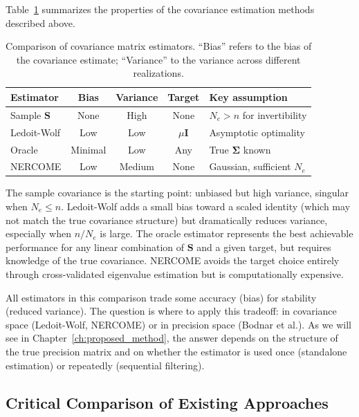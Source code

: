 Table~\ref{tab:cov_estimator_comparison} summarizes the properties of the covariance estimation methods described above.

\begin{table}[htbp]
\centering
\caption{Comparison of covariance matrix estimators. ``Bias'' refers to the bias of the covariance estimate; ``Variance'' to the variance across different realizations.}
\label{tab:cov_estimator_comparison}
\begin{tabular}{@{}lcccl@{}}
\toprule
Estimator & Bias & Variance & Target & Key assumption \\
\midrule
Sample $\mathbf{S}$ & None & High & None & $N_e > n$ for invertibility \\
Ledoit-Wolf & Low & Low & $\mu\mathbf{I}$ & Asymptotic optimality \\
Oracle & Minimal & Low & Any & True $\boldsymbol{\Sigma}$ known \\
NERCOME & Low & Medium & None & Gaussian, sufficient $N_e$ \\
\bottomrule
\end{tabular}
\end{table}

The sample covariance is the starting point: unbiased but high variance, singular when $N_e \leq n$. Ledoit-Wolf adds a small bias toward a scaled identity (which may not match the true covariance structure) but dramatically reduces variance, especially when $n/N_e$ is large. The oracle estimator represents the best achievable performance for any linear combination of $\mathbf{S}$ and a given target, but requires knowledge of the true covariance. NERCOME avoids the target choice entirely through cross-validated eigenvalue estimation but is computationally expensive.

All estimators in this comparison trade some accuracy (bias) for stability (reduced variance). The question is where to apply this tradeoff: in covariance space (Ledoit-Wolf, NERCOME) or in precision space (Bodnar et al.). As we will see in Chapter~\ref{ch:proposed_method}, the answer depends on the structure of the true precision matrix and on whether the estimator is used once (standalone estimation) or repeatedly (sequential filtering).

\subsection{Critical Comparison of Existing Approaches}
\label{sec:critical_comparison}

